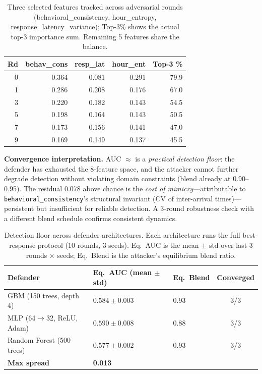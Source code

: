 \documentclass[sigconf,nonacm=false]{acmart}
\begin{document}
\begin{table}[t]
\caption{Three selected features tracked across adversarial rounds (behavioral\_consistency, hour\_entropy, response\_latency\_variance); Top-3\% shows the actual top-3 importance sum. Remaining 5 features share the balance.\protect\footnotemark}
\label{tab:feat_evolution}
\small
\begin{tabular}{rrrrr}
\toprule
Rd & behav\_cons & resp\_lat & hour\_ent & Top-3 \% \\
\midrule
0 & 0.364 & 0.081 & 0.291 & 79.9 \\
1 & 0.286 & 0.208 & 0.176 & 67.0 \\
3 & 0.220 & 0.182 & 0.143 & 54.5 \\
5 & 0.198 & 0.164 & 0.143 & 50.5 \\
7 & 0.173 & 0.156 & 0.141 & 47.0 \\
9 & 0.169 & 0.149 & 0.137 & 45.5 \\
\bottomrule
\end{tabular}
\end{table}

\textbf{Convergence interpretation.} AUC $\approx$\bestResponseAucFloorMean{} is a \emph{practical detection floor}: the defender has exhausted the 8-feature space, and the attacker cannot further degrade detection without violating domain constraints (blend already at 0.90--0.95). The residual 0.078 above chance is the \textit{cost of mimicry}---attributable to \texttt{behavioral\_consistency}'s structural invariant (CV of inter-arrival times)---persistent but insufficient for reliable detection. A 3-round robustness check with a different blend schedule confirms consistent dynamics.

\begin{table}[t]
\caption{Detection floor across defender architectures. Each architecture runs the full best-response protocol (10 rounds, 3 seeds). Eq.\ AUC is the mean $\pm$ std over last 3 rounds $\times$ seeds; Eq.\ Blend is the attacker's equilibrium blend ratio.}
\label{tab:defender_arch}
\small
\begin{tabular}{lllc}
\toprule
Defender & Eq.\ AUC (mean $\pm$ std) & Eq.\ Blend & Converged \\
\midrule
GBM (150 trees, depth 4) & $0.584 \pm 0.003$ & 0.93 & 3/3 \\
MLP (64$\to$32, ReLU, Adam) & $0.590 \pm 0.008$ & 0.88 & 3/3 \\
Random Forest (500 trees) & $0.577 \pm 0.002$ & 0.93 & 3/3 \\
\midrule
\textbf{Max spread} & \textbf{0.013} & & \\
\bottomrule
\end{tabular}
\end{table}
\end{document}
